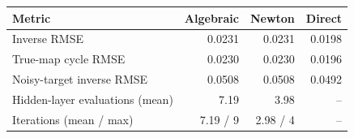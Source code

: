 \begin{tabular}{lrrr}
\toprule
Metric & Algebraic & Newton & Direct \\
\midrule
Inverse RMSE & 0.0231 & 0.0231 & 0.0198 \\
True-map cycle RMSE & 0.0230 & 0.0230 & 0.0196 \\
Noisy-target inverse RMSE & 0.0508 & 0.0508 & 0.0492 \\
Hidden-layer evaluations (mean) & 7.19 & 3.98 & -- \\
Iterations (mean / max) & 7.19 / 9 & 2.98 / 4 & -- \\
\bottomrule
\end{tabular}
